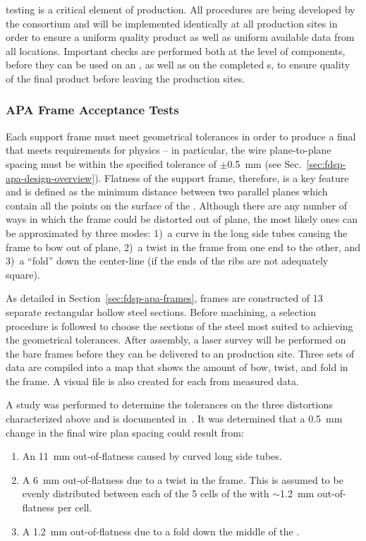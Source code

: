  testing is a critical element of  production.  All  procedures are being developed by the consortium and will be implemented identically at all production sites in order to ensure a uniform quality product as well as uniform available data from all locations.  Important  checks are performed both at the level of components, before they can be used on an , as well as on the completed s, to ensure quality of the final product before leaving the production sites.  



\subsubsection{APA Frame Acceptance Tests} 

Each  support frame must meet geometrical tolerances in order to produce a final  that meets requirements for physics -- in particular, the wire plane-to-plane spacing must be within the specified tolerance of $\pm$\SI{0.5}{mm} (see Sec.~\ref{sec:fdsp-apa-design-overview}).  Flatness of the support frame, therefore, is a key feature and is defined as the minimum distance between two parallel planes which contain all the points on the surface of the .  Although there are any number of ways in which the frame could be distorted out of plane, the most likely ones can be approximated by three modes: 1)~a curve in the long side tubes causing the frame to bow out of plane, 2)~a twist in the frame from one end to the other, and 3)~a ``fold'' down the center-line (if the ends of the ribs are not adequately square).

As detailed in Section~\ref{sec:fdsp-apa-frames},  frames are constructed of 13 separate rectangular hollow steel sections.  Before machining, a selection procedure is followed to choose the sections of the steel most suited to achieving the geometrical tolerances.  After assembly, a laser survey will be performed on the bare frames before they can be delivered to an  production site. Three sets of data are compiled into a map that shows the amount of bow, twist, and fold in the frame. A visual file is also created for each  from measured data. 

A study was performed to determine the tolerances on the three distortions characterized above and is documented in~\cite{bib:docdb1300}.  It was determined that a \SI{0.5}{mm} change in the final wire plan spacing could result from:
\begin{enumerate}
\item An \SI{11}{mm} out-of-flatness caused by curved long side tubes.
\item A \SI{6}{mm} out-of-flatness due to a twist in the frame.  This is assumed to be evenly distributed between each of the 5 cells of the  with $\sim$\SI{1.2}{mm} out-of-flatness per cell.
\item A \SI{1.2}{mm} out-of-flatness due to a fold down the middle of the .
\end{enumerate}

